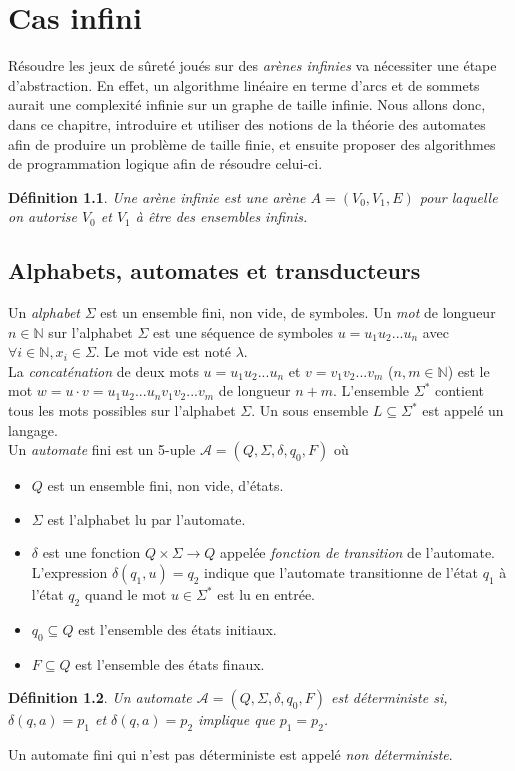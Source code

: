 \documentclass[12pt,a4paper,oneside,titlepage]{report}
\newtheorem{defi}{D\'efinition}[section]
\begin{document}
\chapter{Cas infini}
Résoudre les jeux de sûreté joués sur des \emph{arènes infinies} va nécessiter une étape d'abstraction. En effet, un algorithme linéaire en terme d'arcs et de sommets aurait une complexité infinie sur un graphe de taille infinie. Nous allons donc, dans ce chapitre, introduire et utiliser des notions de la théorie des automates afin de produire un problème de taille finie, et ensuite proposer des algorithmes de programmation logique afin de résoudre celui-ci.
\begin{defi}
Une \emph{arène infinie} est une arène $A=(V_0, V_1, E)$ pour laquelle on autorise $V_0$ et $V_1$ à être des ensembles infinis.
\end{defi}
\section{Alphabets, automates et transducteurs}
Un \emph{alphabet} $\Sigma$ est un ensemble fini, non vide, de symboles. Un \emph{mot} de longueur $n\in\mathbb{N}$ sur l'alphabet $\Sigma$ est une séquence de symboles $u=u_1u_2...u_n$ avec $\forall i\in\mathbb{N}, x_i\in \Sigma$. Le mot vide est noté $\lambda$.\\
La \emph{concaténation} de deux mots $u=u_1u_2...u_n$ et $v=v_1v_2...v_m$ ($n,m\in\mathbb{N}$) est le mot $w=u\cdot v=u_1u_2...u_nv_1v_2...v_m$ de longueur $n+m$. L'ensemble $\Sigma^*$ contient tous les mots possibles sur l'alphabet $\Sigma$. Un sous ensemble $L\subseteq \Sigma^*$ est appelé un langage.\\

\noindent Un \emph{automate} fini est un 5-uple $\mathcal{A}=(Q,\Sigma,\delta,q_0,F)$ où 
\begin{itemize}
	\item $Q$ est un ensemble fini, non vide, d'états.
	\item $\Sigma$ est l'alphabet lu par l'automate.
	\item $\delta$ est une fonction $Q\times\Sigma\to Q$ appelée \emph{fonction de transition} de l'automate. L'expression $\delta(q_1,u)=q_2$ indique que l'automate transitionne de l'état $q_1$ à l'état $q_2$ quand le mot $u\in\Sigma^*$ est lu en entrée.
	\item $q_0\subseteq Q$ est l'ensemble des états initiaux.
	\item $F\subseteq Q$ est l'ensemble des états finaux.
\end{itemize}
\begin{defi}
Un automate $\mathcal{A}=(Q,\Sigma,\delta,q_0,F)$ est \emph{déterministe} si, $\delta(q,a)=p_1$ et $\delta(q,a)=p_2$ implique que $p_1=p_2$.
\end{defi}
Un automate fini qui n'est pas déterministe est appelé \emph{non déterministe}.\\
\end{document}
